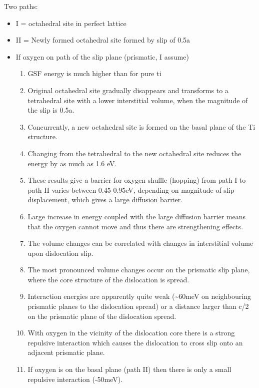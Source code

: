 \documentclass[a4paper,11pt]{article}
\numberwithin{equation}{chapter}
\numberwithin{listing}{chapter}
\begin{document}
Two paths: 
\begin{itemize}
\item I  = octahedral site in perfect lattice
\item II = Newly formed octahedral site formed by slip of 0.5a

\item If oxygen on path of the slip plane (prismatic, I assume)
\begin{enumerate}
\item GSF energy is much higher than for pure ti
\item Original octahedral site gradually disappears and transforms
to a tetrahedral site with a lower interstitial volume, when
the magnitude of the slip is 0.5a.
\item Concurrently, a new octahedral site is formed on the basal
plane of the Ti structure.
\item Changing from the tetrahedral to the new octahedral site
reduces the energy by as much as 1.6 eV.
\item These results give a barrier for oxygen shuffle (hopping) from
path I to path II varies between 0.45-0.95eV, depending on
magnitude of slip displacement, which gives a large diffusion
barrier.
\item Large increase in energy coupled with the large diffusion
barrier means that the oxygen cannot move and thus there are
strengthening effects.
\item The volume changes can be correlated with changes in
interstitial volume upon dislocation slip.
\item The most pronounced volume changes occur on the prismatic slip
plane, where the core structure of the dislocation is spread.
\item Interaction energies are apparently quite weak (\textasciitilde{}60meV on neighbouring
prismatic planes to the dislocation spread) or a distance
larger than c/2 on the prismatic plane of the dislocation
spread.
\item With oxygen in the vicinity of the dislocation core there is
a strong repulsive interaction which causes the dislocation
to cross slip onto an adjacent prismatic plane.
\item If oxygen is on the basal plane (path II) then there is only
a small repulsive interaction (-50meV).
\end{enumerate}
\end{itemize}
\end{document}
